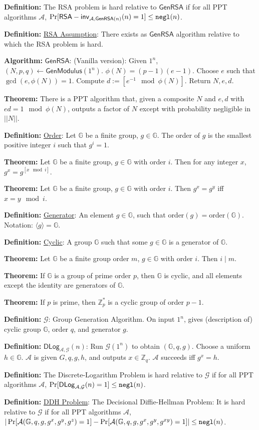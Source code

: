 \documentclass[10pt]{article}
\newcommand{\Z}{\mathbb{Z}}
\newcommand{\G}{\mathbb{G}}
\newcommand{\AAA}{\mathcal{A}}
\newcommand{\GGG}{\mathcal{G}}
\newcommand{\defn}[1]{{\bf Definition:} \underline{#1}}
\newcommand{\thm}[1]{{\bf Theorem:} \underline{#1}}
\newcommand{\alg}[1]{{\bf Algorithm:} \underline{#1}}
\newcommand{\GenM}{\mathsf{GenModulus}}
\newcommand{\GenRSA}{\mathsf{GenRSA}}
\newcommand{\ang}[1]{\langle#1\rangle}
\newcommand{\ExptDLogArgs}[2]{\mathsf{DLog}_{#1,#2}}
\newcommand{\ExptRSAArgs}[2]{\mathsf{RSA-inv}_{#1,#2}}
\newcommand{\ExptDLog}{\ExptDLogArgs{\AAA}{\GGG}}
\newcommand{\ExptRSA}{\ExptRSAArgs{\AAA}{\GenRSA(n)}}
\newcommand{\negl}{{\tt negl}}
\newcommand{\from}{\leftarrow}
\begin{document}
\begin{multicols}{3}
\defn{}The RSA problem is hard relative to $\GenRSA$ if for all PPT algorithms $\AAA$, $\Pr[\ExptRSA(n)=1]\leq\negl(n)$.

\defn{RSA Assumption}: There exists as $\GenRSA$ algorithm relative to which the RSA problem is hard.

\alg{$\GenRSA$}: (Vanilla version): Given $1^n$, $(N,p,q)\from\GenM(1^n)$. $\phi(N)=(p-1)(e-1)$. Choose $e$ such that $\gcd(e,\phi(N))=1$. Compute $d:=[e^{-1}\mod{\phi(N)}]$. Return $N,e,d$.

\thm{}There is a PPT algorithm that, given a composite $N$ and $e,d$ with $ed=1\mod{\phi(N)}$, outputs a factor of $N$ except with probability negligible in $||N||$.

\defn{Order}: Let $\G$ be a finite group, $g\in\G$. The order of $g$ is the smallest positive integer $i$ such that $g^i=1$.

\thm{}Let $\G$ be a finite group, $g\in\G$ with order $i$. Then for any integer $x$, $g^x=g^{[x\mod{i}]}$.

\thm{}Let $\G$ be a finite group, $g\in\G$ with order $i$. Then $g^x=g^y$ iff $x=y\mod{i}$.

\defn{Generator}: An element $g\in\G$, such that order$(g)=$order$(\G)$. Notation: $\ang{g}=\G$.

\defn{Cyclic}: A group $\G$ such that some $g\in\G$ is a generator of $\G$.

\thm{}Let $\G$ be a finite group order $m$, $g\in\G$ with order $i$. Then $i\mid m$.

\thm{}If $\G$ is a group of prime order $p$, then $\G$ is cyclic, and all elements except the identity are generators of $\G$.

\thm{}If $p$ is prime, then $\Z_p^*$ is a cyclic group of order $p-1$.

\defn{$\GGG$}: Group Generation Algorithm. On input $1^n$, gives (description of) cyclic group $\G$, order $q$, and generator $g$.

\defn{$\ExptDLog(n)$}: Run $\GGG(1^n)$ to obtain $(\G,q,g)$. Choose a uniform $h\in\G$. $\AAA$ is given $G,q,g,h$, and outputs $x\in\Z_q$. $\AAA$ succeeds iff $g^x=h$.

\defn{}The Discrete-Logarithm Problem is hard relative to $\GGG$ if for all PPT algorithms $\AAA$, $\Pr[\ExptDLog(n)=1]\leq\negl(n)$.

\defn{DDH Problem}: The Decisional Diffie-Hellman Problem: It is hard relative to $\GGG$ if for all PPT algorithms $\AAA$, $|\Pr[\AAA(\G,q,g,g^x,g^y,g^z)=1]-\Pr[\AAA(\G,q,g,g^x,g^y,g^{xy})=1]|\leq\negl(n)$.


\end{multicols}
\end{document}
